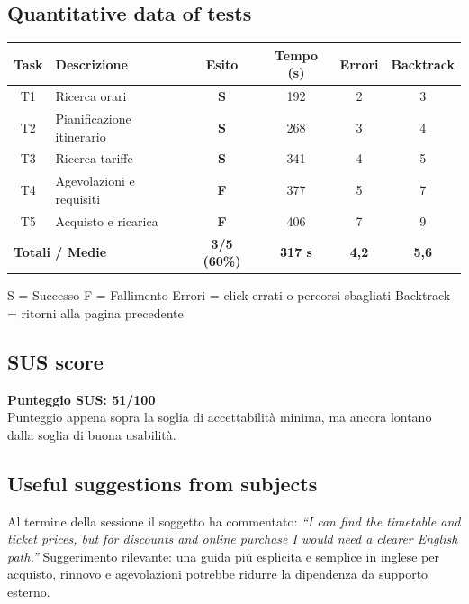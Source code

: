 ﻿\documentclass[11pt,a4paper]{article}
\begin{document}
\subsection*{Quantitative data of tests}
\begin{tcolorbox}[base]
\begin{center}
\renewcommand{\arraystretch}{1.4}
\begin{tabular}{clcccc}
\toprule
\textbf{Task} & \textbf{Descrizione} &
\textbf{Esito} & \textbf{Tempo (s)} &
\textbf{Errori} & \textbf{Backtrack} \\
\midrule
T1 & Ricerca orari             & \textbf{S} & 192 & 2 & 3 \\
T2 & Pianificazione itinerario & \textbf{S} & 268 & 3 & 4 \\
T3 & Ricerca tariffe           & \textbf{S} & 341 & 4 & 5 \\
T4 & Agevolazioni e requisiti  & \textbf{F} & 377 & 5 & 7 \\
T5 & Acquisto e ricarica       & \textbf{F} & 406 & 7 & 9 \\
\midrule
\multicolumn{2}{l}{\textbf{Totali / Medie}} &
\textbf{3/5 (60\%)} & \textbf{317 s} &
\textbf{4,2} & \textbf{5,6} \\
\bottomrule
\end{tabular}
\end{center}
\vspace{0.3cm}
\small S = Successo \quad F = Fallimento \quad Errori = click errati o percorsi sbagliati \quad Backtrack = ritorni alla pagina precedente
\end{tcolorbox}

\subsection*{SUS score}
\begin{tcolorbox}[base]
\textbf{Punteggio SUS: 51/100}\\[0.2cm]
\small Punteggio appena sopra la soglia di accettabilità minima, ma ancora lontano dalla soglia di buona usabilità.
\end{tcolorbox}

\subsection*{Useful suggestions from subjects}
\begin{tcolorbox}[base]
Al termine della sessione il soggetto ha commentato:
\textit{``I can find the timetable and ticket prices, but for discounts and online purchase I would need a clearer English path.''}
Suggerimento rilevante: una guida più esplicita e semplice in inglese per acquisto, rinnovo e agevolazioni potrebbe ridurre la dipendenza da supporto esterno.
\end{tcolorbox}
\end{document}
